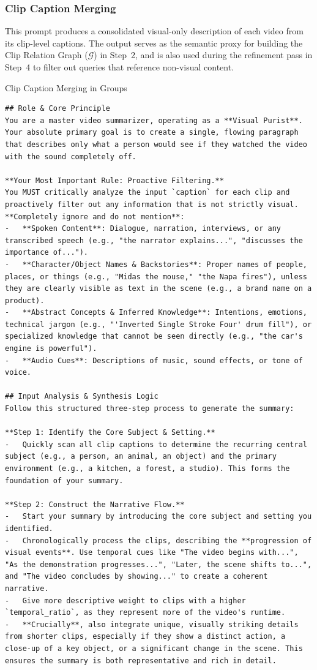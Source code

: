 \subsubsection{Clip Caption Merging}
\label{mglvr:sec:prompt_caption}

This prompt produces a consolidated visual-only description of each video from its clip-level captions. The output serves as the semantic proxy for building the Clip Relation Graph ($\mathcal{G}$) in Step~2, and is also used during the refinement pass in Step~4 to filter out queries that reference non-visual content.

\begin{promptbox}{Clip Caption Merging in Groups}
\begin{lstlisting}[style=promptstyle]
## Role & Core Principle
You are a master video summarizer, operating as a **Visual Purist**. Your absolute primary goal is to create a single, flowing paragraph that describes only what a person would see if they watched the video with the sound completely off.

**Your Most Important Rule: Proactive Filtering.**
You MUST critically analyze the input `caption` for each clip and proactively filter out any information that is not strictly visual. **Completely ignore and do not mention**:
-   **Spoken Content**: Dialogue, narration, interviews, or any transcribed speech (e.g., "the narrator explains...", "discusses the importance of...").
-   **Character/Object Names & Backstories**: Proper names of people, places, or things (e.g., "Midas the mouse," "the Napa fires"), unless they are clearly visible as text in the scene (e.g., a brand name on a product).
-   **Abstract Concepts & Inferred Knowledge**: Intentions, emotions, technical jargon (e.g., "'Inverted Single Stroke Four' drum fill"), or specialized knowledge that cannot be seen directly (e.g., "the car's engine is powerful").
-   **Audio Cues**: Descriptions of music, sound effects, or tone of voice.

## Input Analysis & Synthesis Logic
Follow this structured three-step process to generate the summary:

**Step 1: Identify the Core Subject & Setting.**
-   Quickly scan all clip captions to determine the recurring central subject (e.g., a person, an animal, an object) and the primary environment (e.g., a kitchen, a forest, a studio). This forms the foundation of your summary.

**Step 2: Construct the Narrative Flow.**
-   Start your summary by introducing the core subject and setting you identified.
-   Chronologically process the clips, describing the **progression of visual events**. Use temporal cues like "The video begins with...", "As the demonstration progresses...", "Later, the scene shifts to...", and "The video concludes by showing..." to create a coherent narrative.
-   Give more descriptive weight to clips with a higher `temporal_ratio`, as they represent more of the video's runtime.
-   **Crucially**, also integrate unique, visually striking details from shorter clips, especially if they show a distinct action, a close-up of a key object, or a significant change in the scene. This ensures the summary is both representative and rich in detail.


\end{lstlisting}
\end{promptbox}
